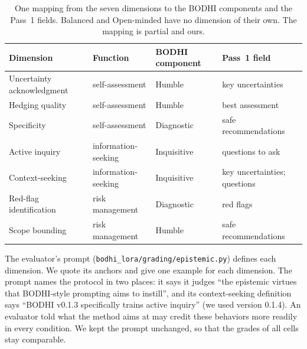 \documentclass{article}
\newcommand{\bodhi}{BODHI}
\begin{document}
\begin{table}[h]
\centering
\small
\caption{One mapping from the seven dimensions to the \bodhi{} components and the Pass~1 fields.
Balanced and Open-minded have no dimension of their own. The mapping is partial and ours.}
\label{tab:bodhi-map}
\begin{tabular}{llll}
\toprule
Dimension & Function & \bodhi{} component & Pass~1 field \\
\midrule
Uncertainty acknowledgment & self-assessment & Humble & key uncertainties \\
Hedging quality & self-assessment & Humble & best assessment \\
Specificity & self-assessment & Diagnostic & safe recommendations \\
Active inquiry & information-seeking & Inquisitive & questions to ask \\
Context-seeking & information-seeking & Inquisitive & key uncertainties; questions \\
Red-flag identification & risk management & Diagnostic & red flags \\
Scope bounding & risk management & Humble & safe recommendations \\
\bottomrule
\end{tabular}
\end{table}

The evaluator's prompt (\texttt{bodhi\_lora/grading/epistemic.py}) defines each dimension. We quote its
anchors and give one example for each dimension. The prompt names the protocol in two places: it
says it judges ``the epistemic virtues that BODHI-style prompting aims to instill'', and its
context-seeking definition says ``BODHI v0.1.3 specifically trains active inquiry'' (we used version
0.1.4). An evaluator told what the method aims at may credit these behaviors more readily in every
condition. We kept the prompt unchanged, so that the grades of all cells stay comparable.
\end{document}

